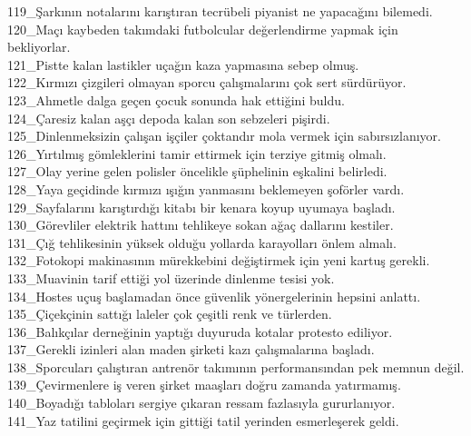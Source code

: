 \begin{myparindent}{0pt}
119\_Şarkının notalarını karıştıran tecrübeli piyanist ne yapacağını bilemedi. \\
120\_Maçı kaybeden takımdaki futbolcular değerlendirme yapmak için bekliyorlar. \\
121\_Pistte kalan lastikler uçağın kaza yapmasına sebep olmuş. \\
122\_Kırmızı çizgileri olmayan sporcu çalışmalarını çok sert sürdürüyor. \\
123\_Ahmetle dalga geçen çocuk sonunda hak ettiğini buldu. \\
124\_Çaresiz kalan aşçı depoda kalan son sebzeleri pişirdi. \\
125\_Dinlenmeksizin çalışan işçiler çoktandır mola vermek için sabırsızlanıyor. \\
126\_Yırtılmış gömleklerini tamir ettirmek için terziye gitmiş olmalı. \\
127\_Olay yerine gelen polisler öncelikle şüphelinin eşkalini belirledi. \\
128\_Yaya geçidinde kırmızı ışığın yanmasını beklemeyen şoförler vardı. \\
129\_Sayfalarını karıştırdığı kitabı bir kenara koyup uyumaya başladı. \\
130\_Görevliler elektrik hattını tehlikeye sokan ağaç dallarını kestiler. \\
131\_Çığ tehlikesinin yüksek olduğu yollarda karayolları önlem almalı. \\
132\_Fotokopi makinasının mürekkebini değiştirmek için yeni kartuş gerekli. \\
133\_Muavinin tarif ettiği yol üzerinde dinlenme tesisi yok. \\
134\_Hostes uçuş başlamadan önce güvenlik yönergelerinin hepsini anlattı. \\
135\_Çiçekçinin sattığı laleler çok çeşitli renk ve türlerden. \\
136\_Balıkçılar derneğinin yaptığı duyuruda kotalar protesto ediliyor. \\
137\_Gerekli izinleri alan maden şirketi kazı çalışmalarına başladı. \\
138\_Sporcuları çalıştıran antrenör takımının performansından pek memnun değil. \\
139\_Çevirmenlere iş veren şirket maaşları doğru zamanda yatırmamış. \\
140\_Boyadığı tabloları sergiye çıkaran ressam fazlasıyla gururlanıyor. \\
141\_Yaz tatilini geçirmek için gittiği tatil yerinden esmerleşerek geldi. \\

\end{myparindent}
